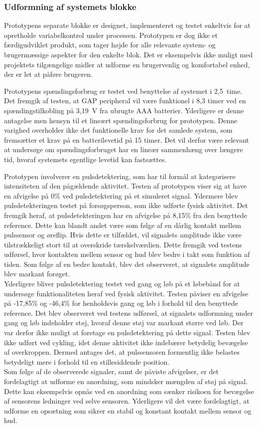 \subsubsection{Udformning af systemets blokke}
Prototypens separate blokke er designet, implementeret og testet enkeltvis for at opretholde variabelkontrol under processen. Prototypen er dog ikke et færdigudviklet produkt, som tager højde for alle relevante system- og brugermæssige aspekter for den enkelte blok. Det er eksempelvis ikke muligt med projektets tilgængelige midler at udforme en brugervenlig og komfortabel enhed, der er let at påføre brugeren.

Prototypens spændingsforbrug er testet ved benyttelse af systemet i 2,5~time. Det fremgik af testen, at GAP peripheral vil være funktionel i 8,3 timer ved en spændingstilkobling på 3,19~V fra ubrugte AAA batterier. Yderligere er denne antagelse men hensyn til et lineært spændingsforbrug for prototypen. Denne varighed overholder ikke det funktionelle krav for det samlede system, som fremsætter et krav på en batterilevetid på 15 timer. Det vil derfor være relevant at undersøge om spændingsforbruget har en lineær sammenhæng over længere tid, hvoraf systemets egentlige levetid kan fastsættes.  

Prototypen involverer en pulsdetektering, som har til formål at kategorisere intensiteten af den pågældende aktivitet.
Testen af prototypen viser sig at have en afvigelse på 0\% ved pulsdetektering på et simuleret signal. Ydermere blev pulsdetekteringen testet på forsøgsperson, som ikke udførte fysisk aktivitet. Det fremgik heraf, at pulsdetekteringen har en afvigelse på 8,15\% fra den benyttede reference. Dette kan blandt andet være som følge af en dårlig kontakt mellem pulssensor og øreflip. Hvis dette er tilfældet, vil signalets amplitude ikke være tilstrækkeligt stort til at overskride tærskelværdien. Dette fremgik ved testens udførsel, hvor kontakten mellem sensor og hud blev bedre i takt som funktion af tiden. Som følge af en bedre kontakt, blev det observeret, at signalets amplitude blev markant forøget. \\
Yderligere bliver pulsdetektering testet ved gang og løb på et løbebånd for at undersøge funktionaliteten heraf ved fysisk aktivitet. Testen påviser en afvigelse på -17,85\% og -46,4\% for henholdsvis gang og løb i forhold til den benyttede reference. Det blev observeret ved testens udførsel, at signalets udformning under gang og løb indeholder støj, hvoraf denne støj var markant større ved løb. Der var derfor ikke muligt at foretage en pulsdetektering på dette signal. Testen blev ikke udført ved cykling, idet denne aktivitet ikke indebærer betydelig bevægelse af overkroppen. Dermed antages det, at pulssensoren formentlig ikke belastes betydeligt mere i forhold til en stillesiddende position. \\
Som følge af de observerede signaler, samt de påviste afvigelser, er det fordelagtigt at udforme en anordning, som mindsker mængden af støj på signal. Dette kan eksempelvis opnås ved en anordning som sænker risikoen for bevægelse af sensorens ledninger ved selve sensoren. Yderligere vil det være fordelagtigt, at udforme en opsætning som sikrer en stabil og konstant kontakt mellem sensor og hud. 

